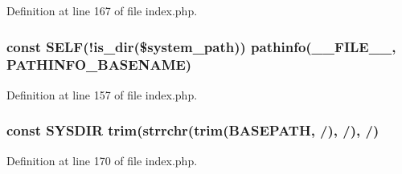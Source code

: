 Definition at line 167 of file index.\+php.

\subsubsection[{\texorpdfstring{S\+E\+LF}{SELF}}]{\setlength{\rightskip}{0pt plus 5cm}const S\+E\+LF(!is\+\_\+dir(\$system\+\_\+path)) pathinfo(\+\_\+\+\_\+\+F\+I\+L\+E\+\_\+\+\_\+, P\+A\+T\+H\+I\+N\+F\+O\+\_\+\+B\+A\+S\+E\+N\+A\+ME)}\hypertarget{vendors_2tinymce_2plugins_2jbimages_2ci_2index_8php_a428c045e64680e1582ba74161e441a1c}{}\label{vendors_2tinymce_2plugins_2jbimages_2ci_2index_8php_a428c045e64680e1582ba74161e441a1c}


Definition at line 157 of file index.\+php.

\subsubsection[{\texorpdfstring{S\+Y\+S\+D\+IR}{SYSDIR}}]{\setlength{\rightskip}{0pt plus 5cm}const S\+Y\+S\+D\+IR trim(strrchr(trim({\bf B\+A\+S\+E\+P\+A\+TH}, \textquotesingle{}/\textquotesingle{}), \textquotesingle{}/\textquotesingle{}), \textquotesingle{}/\textquotesingle{})}\hypertarget{vendors_2tinymce_2plugins_2jbimages_2ci_2index_8php_ab645ae0961792b1f2b4b83f89cb95fa5}{}\label{vendors_2tinymce_2plugins_2jbimages_2ci_2index_8php_ab645ae0961792b1f2b4b83f89cb95fa5}


Definition at line 170 of file index.\+php.

